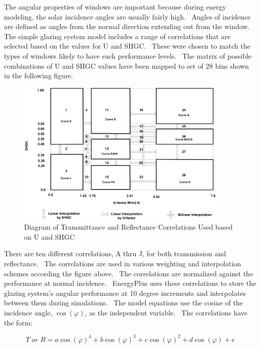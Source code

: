 The angular properties of windows are important because during energy modeling, the solar incidence angles are usually fairly high.~ Angles of incidence are defined as angles from the normal direction extending out from the window.~ The simple glazing system model includes a range of correlations that are selected based on the values for U and SHGC.~ These were chosen to match the types of windows likely to have such performance levels.~ The matrix of possible combinations of U and SHGC values have been mapped to set of 28 bins shown in the following figure.

\begin{figure}[hbtp] %
\centering
\includegraphics[width=0.9\textwidth, height=0.9\textheight, keepaspectratio=true]{media/image947.png}
\caption{Diagram of Transmittance and Reflectance Correlations Used based on U and SHGC \label{fig:diagram-of-transmittance-and}}
\end{figure}

There are ten different correlations, A thru J, for both transmission and reflectance.~ The correlations are used in various weighting and interpolation schemes according the figure above.~ The correlations are normalized against the performance at normal incidence.~ EnergyPlus uses these correlations to store the glazing system's angular performance at 10 degree increments and interpolates between them during simulations.~ The model equations use the cosine of the incidence angle, \(\cos (\varphi )\), as the independent variable.~ The correlations have the form:

\begin{equation}
T\;or\;R = a\cos {(\varphi )^4} + b\cos {(\varphi )^3} + c\cos {(\varphi )^2} + d\cos (\varphi ) + e
\end{equation}

